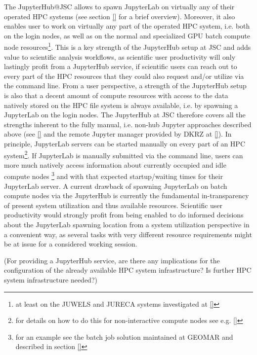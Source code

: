 The JupyterHub@JSC allows to spawn JupyterLab on virtually any of their operated HPC systems (see section \ref{} for a brief overview).
Moreover, it also enables user to work on virtually any part of the operated HPC system, i.e. both on the login nodes, as well as on the normal and specialized GPU batch compute node resources\footnote{at least on the JUWELS and JURECA systems investigated at \ref{}}.
This is a key strength of the JupyterHub setup at JSC and adds value to scientific analysis workflows, as scientific user productivity will only lastingly profit from a JupyterHub service, if scientific users can reach out to every part of the HPC resources that they could also request and/or utilize via the command line.
From a user perspective, a strength of the JupyterHub setup is also that a decent amount of compute resources with access to the data natively stored on the HPC file system is always available, i.e. by spawning a JupyterLab on the login nodes.
The JupyterHub at JSC therefore covers all the strengths inherent to the fully manual, i.e. non-hub Jupyter approaches described above (see \ref{} and the remote Jupyter manager provided by DKRZ at \ref{}).
In principle, JupyterLab servers can be started manually on every part of an HPC system\footnote{for details on how to do this for non-interactive compute nodes see e.g. \ref{}}.
If JupyterLab is manually submitted via the command line, users can more much natively access information about currently occupied and idle compute nodes \footnote{for an example see the batch job solution maintained at GEOMAR and described in section \ref{}} and with that expected startup/waiting times for their JupyterLab server.
A current drawback of spawning JupyterLab on batch compute nodes via the JupyterHub is currently the fundamental in-transparency of present system utilization and thus available resources.
Scientific user productivity would strongly profit from being enabled to do informed decisions about the JupyterLab spawning location from a system utilization perspective in a convenient way, as several tasks with very different resource requirements might be at issue for a considered working session.

(For providing a JupyterHub service, are there any implications for the configuration of the already available HPC system infrastructure? Is further HPC system infrastructure needed?)

